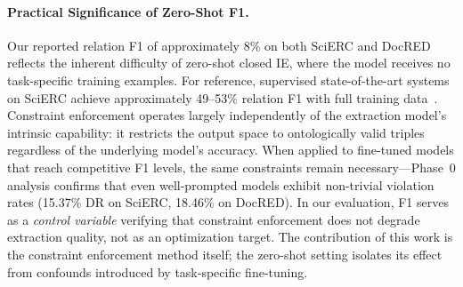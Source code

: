 

\paragraph{Practical Significance of Zero-Shot F1.}
Our reported relation F1 of approximately 8\% on both SciERC and DocRED reflects the inherent difficulty of zero-shot closed IE, where the model receives no task-specific training examples.
For reference, supervised state-of-the-art systems on SciERC achieve approximately 49--53\% relation F1 with full training data~\citep{zhong2021frustratingly,ye2022packed}.
Constraint enforcement operates largely independently of the extraction model's intrinsic capability: it restricts the output space to ontologically valid triples regardless of the underlying model's accuracy.
When applied to fine-tuned models that reach competitive F1 levels, the same constraints remain necessary---Phase~0 analysis confirms that even well-prompted models exhibit non-trivial violation rates (15.37\% DR on SciERC, 18.46\% on DocRED).
In our evaluation, F1 serves as a \emph{control variable} verifying that constraint enforcement does not degrade extraction quality, not as an optimization target.
The contribution of this work is the constraint enforcement method itself; the zero-shot setting isolates its effect from confounds introduced by task-specific fine-tuning.


